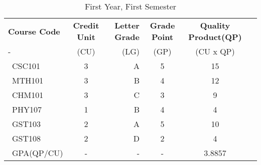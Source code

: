 \documentclass{article}
\begin{document}
	\begin{table}
			\begin{center}
			\caption{First Year, First Semester}
			\label{tab:table1}
			\begin{tabular}{l|c|r|c|c|c}
				\textbf{Course Code} & \textbf{Credit Unit} & 
				\textbf{Letter Grade} & \textbf{Grade Point} & 
				\textbf{Quality Product(QP)}\\
				- & (CU) & (LG) & (GP) & (CU x QP) \\
				\hline
				\ CSC101 & 3 & A & 5 & 15\\
				\ MTH101 & 3 & B & 4 & 12\\
				\ CHM101 & 3 & C & 3 & 9\\
				\ PHY107 & 1 & B & 4 & 4\\
				\ GST103 & 2 & A & 5 & 10\\
				\ GST108 & 2 & D & 2 & 4\\
				\ GPA(QP/CU) & - & - & - & 3.8857\\
			\end{tabular}
		\end{center}
	\end{table}
\end{document}
